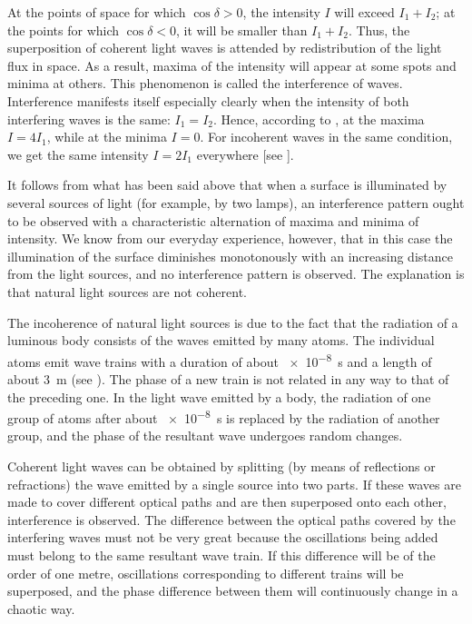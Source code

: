 \noindent
At the points of space for which $\cos\delta>0$, the intensity $I$ will exceed $I_1+I_2$; at the points for which $\cos\delta<0$, it will be smaller
than $I_1+I_2$.
Thus, the superposition of coherent light waves is attended by redistribution of the light flux in space.
As a result, maxima of the intensity will appear at some spots and minima at others.
This phenomenon is called the interference of waves.
Interference manifests itself especially clearly when the intensity of both interfering waves is the same: $I_1=I_2$.
Hence, according to , at the maxima $I=4I_1$, while at the minima $I=0$.
For incoherent waves in the same condition, we get the same intensity $I=2I_1$ everywhere [see ].

It follows from what has been said above that when a surface is illuminated by several sources of light (for example, by two lamps), an interference pattern ought to be observed with a characteristic alternation of maxima and minima of intensity.
We know from our everyday experience, however, that in this case the illumination of the surface diminishes monotonously with an increasing distance from the light sources, and no interference pattern is observed.
The explanation is that natural light sources are not coherent.

The incoherence of natural light sources is due to the fact that the radiation of a luminous body consists of the waves emitted by many atoms.
The individual atoms emit wave trains with a duration of about \SI{e-8}{\second} and a length of about \SI{3}{\metre} (see ).
The phase of a new train is not related in any way to that of the preceding one.
In the light wave emitted by a body, the radiation of one group of atoms after about \SI{e-8}{\second} is replaced by the radiation of another group, and the phase of the resultant wave undergoes random changes.

Coherent light waves can be obtained by splitting (by means of reflections or refractions) the wave emitted by a single source into two parts.
If these waves are made to cover different optical paths and are then superposed onto each other, interference is observed.
The difference between the optical paths covered by the interfering waves must not be very great because the oscillations being added must belong to the same resultant wave train.
If this difference will be of the order of one metre, oscillations corresponding to different trains will be superposed, and the phase difference between them will continuously change in a chaotic way.

